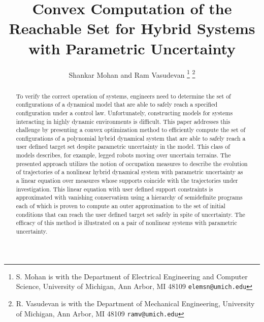 \documentclass[letterpaper]{ieeeconf}
\title{Convex Computation of the Reachable Set for Hybrid Systems with Parametric Uncertainty}
\author{Shankar Mohan and Ram Vasudevan \vspace*{-0.75cm}
 \thanks{S. Mohan is with the Department of Electrical Engineering and Computer Science, University of Michigan, Ann Arbor, MI 48109
{\scriptsize \texttt{elemsn@umich.edu}}}
 \thanks{R. Vasudevan is with the Department of Mechanical Engineering, University of Michigan, Ann Arbor, MI 48109
{\scriptsize \texttt{ramv@umich.edu}}}%
}
\theoremstyle{remark}
\theoremstyle{definition}
\begin{document}
\maketitle
  \begin{abstract}
  	To verify the correct operation of systems, engineers need to determine the set of configurations of a dynamical model that are able to safely reach a specified configuration under a control law.
	Unfortunately, constructing models for systems interacting in highly dynamic environments is difficult.
	This paper addresses this challenge by presenting a convex optimization method to efficiently compute the set of configurations of a polynomial hybrid dynamical system that are able to safely reach a user defined target set despite parametric uncertainty in the model.
	This class of models describes, for example, legged robots moving over uncertain terrains.
	The presented approach utilizes the notion of occupation measures to describe the evolution of trajectories of a nonlinear hybrid dynamical system with parametric uncertainty as a linear equation over measures whose supports coincide with the trajectories under investigation.
	This linear equation with user defined support constraints is approximated with vanishing conservatism using a hierarchy of semidefinite programs each of which is proven to compute an outer approximation to the set of initial conditions that can reach the user defined target set safely in spite of uncertainty.
	The efficacy of this method is illustrated on a pair of nonlinear systems with parametric uncertainty.
  \end{abstract}
  
  
  
  
  
  
  \appendix
  


\end{document}
